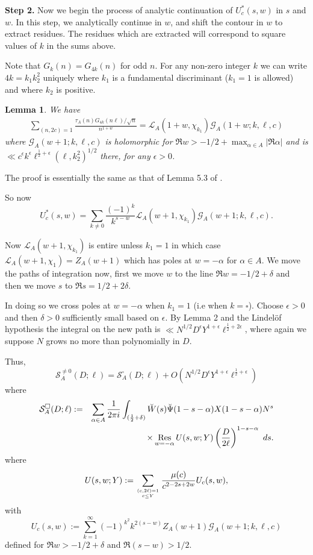 \documentclass[12pt]{amsart}
\newtheorem{lemma}{Lemma}
\begin{document}
	\textbf{Step 2.} Now we begin the process of analytic continuation of $ U^\ast_c(s,w)$ in $s$ and $w$. In this step, we analytically continue in $w$, and shift the contour in $w$ to extract residues. The residues which are extracted will correspond to square values of $k$ in the sums above.
	
	Note that  $G_{k}(n)=G_{4k}(n)$ for odd $n$. For any non-zero integer $k$  we can write $4k=k_1 k_2^2$ uniquely where $k_1$ is a fundamental discriminant ($k_1=1$ is allowed) and where $k_2$ is positive. 
	\begin{lemma} \label{lemma:tau G continuation}
		We have
		\begin{eqnarray*} 
			\sum_{(n,2c)=1} \frac{\tau_A(n) G_{4k}(n\ell)/\sqrt{n}}{n^{1+w}}
			=\mathcal L_A(1+w,\chi_{k_1})  \mathcal{G}_A(1+w;k,\ell,c)
		\end{eqnarray*}
		where
		$ \mathcal{G}_A(w+1;k,\ell,c)$ is holomorphic for $\Re w>-1/2+\max_{\alpha \in A}|\Re \alpha|$ and is $\ll c^\epsilon k^\epsilon \ell^{\frac12+\epsilon}(\ell,k_2^2)^{1/2}$ there, for any $\epsilon > 0$.
	\end{lemma}
	The proof is essentially the same as that of Lemma 5.3 of \cite{Sou}.
	
	So now 
	$$  U^\ast_c(s,w)=   \sum_{k\ne 0}\frac{(-1)^k }{k^{s-w}} \mathcal L_A(w+1,\chi_{k_1})  \mathcal{G}_A(w+1; k,\ell,c).$$
	
	Now $\mathcal L_A(w+1,\chi_{k_1})$ is entire unless
	$k_1=1$ in which case $\mathcal L_A(w+1,\chi_{1}) = Z_A(w+1)$ which has poles at $w=-\alpha$ for $\alpha \in A$. 
	We move the paths of integration now, first we move $w$ to the line $\Re w=-1/2+\delta$ and then we move $s$ to $\Re s=1/2 +2\delta$.  
	
	In doing so we cross poles at $w=-\alpha$ when $k_1=1$ (i.e when $k=\square$).  Choose $\epsilon > 0$ and then $\delta >0$ sufficiently small based on $\epsilon$. By Lemma 2 and the Lindel\"{o}f hypothesis the integral on the new path is $\ll N^{1/2}D^{\epsilon}Y^{1+\epsilon}\ell^{\frac 12+2\epsilon} $, where again we suppose $N$ grows no more than polynomially in $D$.
	
	Thus,
	$$ \mathcal S_A^{\ne 0}(D;\ell) = \mathcal S_A^{\square}(D;\ell) +O(N^{1/2}D^{\epsilon}Y^{1+\epsilon}\ell^{\frac 12+\epsilon})$$
	where
	\begin{eqnarray} \label{eqn:S1}  \mathcal S_A^{\square}(D;\ell) &:=& \nonumber
		\sum_{\alpha\in A}  \frac 1{2\pi i} \int_{( \frac 12 +\delta)}    \breve{W}(s)\breve{\Psi}(1-s-\alpha) X(1-s-\alpha)N^s \\&& \qquad 
		\times   \operatornamewithlimits{Res}_{w=-\alpha} U(s,w;Y)  \left( \frac{D}{2\ell}\right)^{1-s-\alpha}
		~ds.
	\end{eqnarray}
	where
	\begin{eqnarray*}
		U(s,w;Y):= 
		\sum_{(c,2\ell)=1\atop c\le Y}\frac{\mu(c)}{c^{2-2s+2w}} U_c(s,w),\end{eqnarray*}
	with 
	$$
	U_c(s,w) := \sum_{k=1}^\infty (-1)^{k^2}{k^{2(s-w)}} Z_A(w+1)\mathcal{G}_A(w+1;k,\ell,c)
	$$
	defined for $\Re w > -1/2+\delta$ and $\Re(s-w) > 1/2$.
	
\end{document}
